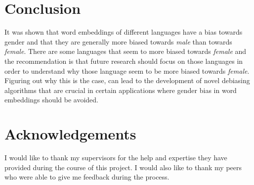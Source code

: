 \section{Conclusion}
It was shown that word embeddings of different languages have a bias towards gender and
that they are generally more biased towards \emph{male} than towards \emph{female}.
There are some languages that seem to more biased towards \emph{female} and the
recommendation is that future research should focus on those languages in order to
understand why those language seem to be more biased towards \emph{female}. Figuring out
why this is the case, can lead to the development of novel debiasing algorithms that
are crucial in certain applications where gender bias in word embeddings should be
avoided.

\section{Acknowledgements}
I would like to thank my supervisors for the help and expertise they have provided
during the course of this project. I would also like to thank my peers who were able
to give me feedback during the process.
